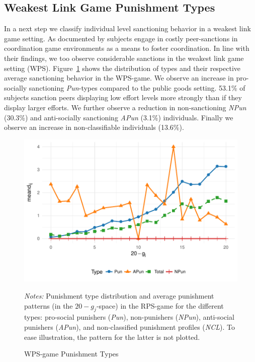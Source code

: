 \documentclass[11pt,a4paper]{article}
\begin{document}
\begin{refsection}
\subsection{Weakest Link Game Punishment Types}
%
In a next step we classify individual level sanctioning behavior in a weakest
link game setting. As documented by \cite{Lec2015} subjects engage in
costly peer-sanctions in coordination game environments as a means to foster
coordination. In line with their findings, we too observe considerable
sanctions in the weakest link game setting (WPS). Figure~\ref{fig:wpstype} shows
the distribution of types and their respective average sanctioning behavior in
the WPS-game. We observe an
increase in pro-socially sanctioning \emph{Pun}-types compared to the public
goods setting. 53.1\% of subjects sanction peers displaying low effort levels
more strongly than if they display larger efforts. We further observe a
reduction in non-sanctioning \emph{NPun} (30.3\%) and anti-socially sanctioning
\emph{APun} (3.1\%) individuals. Finally we observe an increase in
non-classifiable individuals (13.6\%).
%
\begin{figure}[tbp]
  \caption{WPS-game Punishment Types}
  \centering
  \includegraphics[width=.6\linewidth,clip,viewport={0 30 430 280}]{img/61_type}
  \label{fig:wpstype}
        \parbox{.95\textwidth}{\footnotesize \textit{Notes:} Punishment type
          distribution and average punishment patterns (in the $20 - g_j$-space)
          in the RPS-game
          for the different types: pro-social punishers (\emph{Pun}),
          non-punishers (\emph{NPun}), anti-social punishers (\emph{APun}), and
          non-classified punishment profiles (\textit{NCL}). To ease
          illustration, the pattern for the latter is not plotted.} 
\end{figure}



\end{refsection}
\end{document}

